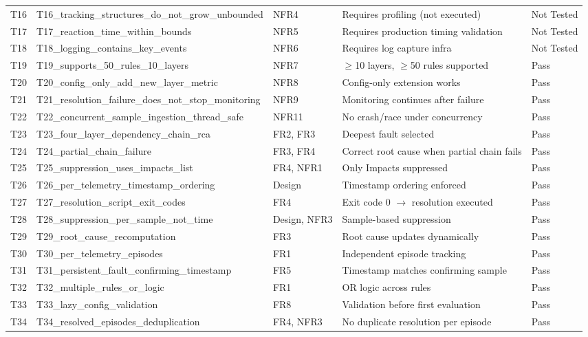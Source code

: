 \begin{table}[htbp]
\begin{tabular}{p{1.2cm} p{4.3cm} p{2.3cm} p{5.2cm} p{1.5cm}}
T16 & T16\_tracking\_structures\_do\_not\_grow\_unbounded & NFR4 & Requires profiling (not executed) & Not Tested \\
T17 & T17\_reaction\_time\_within\_bounds & NFR5 & Requires production timing validation & Not Tested \\
T18 & T18\_logging\_contains\_key\_events & NFR6 & Requires log capture infra & Not Tested \\
T19 & T19\_supports\_50\_rules\_10\_layers & NFR7 & $\geq$10 layers, $\geq$50 rules supported & Pass \\
T20 & T20\_config\_only\_add\_new\_layer\_metric & NFR8 & Config-only extension works & Pass \\
T21 & T21\_resolution\_failure\_does\_not\_stop\_monitoring & NFR9 & Monitoring continues after failure & Pass \\
T22 & T22\_concurrent\_sample\_ingestion\_thread\_safe & NFR11 & No crash/race under concurrency & Pass \\
T23 & T23\_four\_layer\_dependency\_chain\_rca & FR2, FR3 & Deepest fault selected & Pass \\
T24 & T24\_partial\_chain\_failure & FR3, FR4 & Correct root cause when partial chain fails & Pass \\
T25 & T25\_suppression\_uses\_impacts\_list & FR4, NFR1 & Only Impacts suppressed & Pass \\
T26 & T26\_per\_telemetry\_timestamp\_ordering & Design & Timestamp ordering enforced & Pass \\
T27 & T27\_resolution\_script\_exit\_codes & FR4 & Exit code 0 $\rightarrow$ resolution executed & Pass \\
T28 & T28\_suppression\_per\_sample\_not\_time & Design, NFR3 & Sample-based suppression & Pass \\
T29 & T29\_root\_cause\_recomputation & FR3 & Root cause updates dynamically & Pass \\
T30 & T30\_per\_telemetry\_episodes & FR1 & Independent episode tracking & Pass \\
T31 & T31\_persistent\_fault\_confirming\_timestamp & FR5 & Timestamp matches confirming sample & Pass \\
T32 & T32\_multiple\_rules\_or\_logic & FR1 & OR logic across rules & Pass \\
T33 & T33\_lazy\_config\_validation & FR8 & Validation before first evaluation & Pass \\
T34 & T34\_resolved\_episodes\_deduplication & FR4, NFR3 & No duplicate resolution per episode & Pass \\

\end{tabular}
\end{table}
